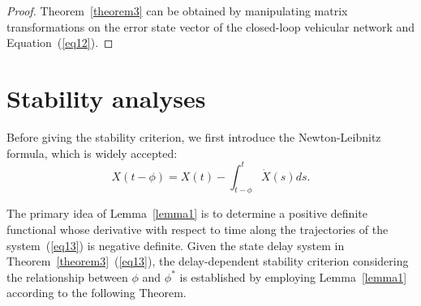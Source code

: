 \documentclass[a4paper]{cas-sc}
\newtheorem*{proof}{Proof}
\begin{document}
\begin{proof}
  Theorem~\ref{theorem3} can be obtained by manipulating matrix transformations on the error state vector of the closed-loop vehicular network and Equation~(\ref{eq12}).
\end{proof}







\section{Stability analyses}
\label{Section 4}
Before giving the stability criterion, we first introduce the Newton-Leibnitz formula, which is widely accepted:
\begin{equation}
  X(t - \phi ) = X(t) - \int_{t - \phi }^t {\dot X(s)ds}.
  \label{eq41}
\end{equation}

The primary idea of Lemma~\ref{lemma1} is to determine a positive definite functional whose derivative with respect to time along the trajectories of the system~(\ref{eq13}) is negative definite. Given the state delay system in Theorem~\ref{theorem3}~(\ref{eq13}), the delay-dependent stability criterion considering the relationship between $\phi$ and $\phi^\ast$ is established by employing Lemma~\ref{lemma1} according to the following Theorem.
\end{document}
